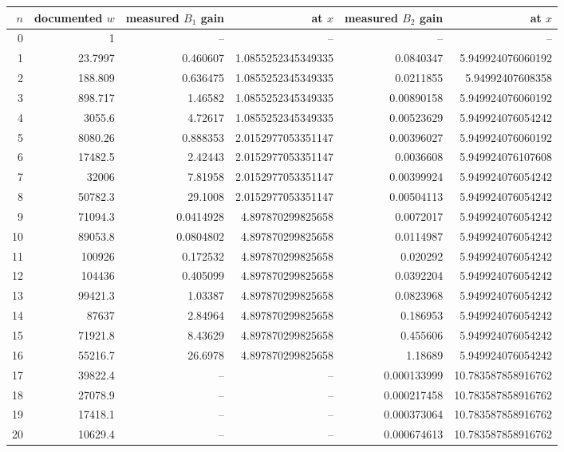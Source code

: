 \begin{tabular}{rrrrrr}
\toprule
$n$ & documented $w$ & measured $B_1$ gain & at $x$ & measured $B_2$ gain & at $x$\\
\midrule
 0 & 1 & -- & -- & -- & --\\
 1 & 23.7997 & 0.460607 & 1.0855252345349335 & 0.0840347 & 5.949924076060192\\
 2 & 188.809 & 0.636475 & 1.0855252345349335 & 0.0211855 & 5.94992407608358\\
 3 & 898.717 & 1.46582 & 1.0855252345349335 & 0.00890158 & 5.949924076060192\\
 4 & 3055.6 & 4.72617 & 1.0855252345349335 & 0.00523629 & 5.949924076054242\\
 5 & 8080.26 & 0.888353 & 2.0152977053351147 & 0.00396027 & 5.949924076060192\\
 6 & 17482.5 & 2.42443 & 2.0152977053351147 & 0.0036608 & 5.949924076107608\\
 7 & 32006 & 7.81958 & 2.0152977053351147 & 0.00399924 & 5.949924076054242\\
 8 & 50782.3 & 29.1008 & 2.0152977053351147 & 0.00504113 & 5.949924076054242\\
 9 & 71094.3 & 0.0414928 & 4.897870299825658 & 0.0072017 & 5.949924076054242\\
10 & 89053.8 & 0.0804802 & 4.897870299825658 & 0.0114987 & 5.949924076054242\\
11 & 100926 & 0.172532 & 4.897870299825658 & 0.020292 & 5.949924076054242\\
12 & 104436 & 0.405099 & 4.897870299825658 & 0.0392204 & 5.949924076054242\\
13 & 99421.3 & 1.03387 & 4.897870299825658 & 0.0823968 & 5.949924076054242\\
14 & 87637 & 2.84964 & 4.897870299825658 & 0.186953 & 5.949924076054242\\
15 & 71921.8 & 8.43629 & 4.897870299825658 & 0.455606 & 5.949924076054242\\
16 & 55216.7 & 26.6978 & 4.897870299825658 & 1.18689 & 5.949924076054242\\
17 & 39822.4 & -- & -- & 0.000133999 & 10.783587858916762\\
18 & 27078.9 & -- & -- & 0.000217458 & 10.783587858916762\\
19 & 17418.1 & -- & -- & 0.000373064 & 10.783587858916762\\
20 & 10629.4 & -- & -- & 0.000674613 & 10.783587858916762\\

\end{tabular}
